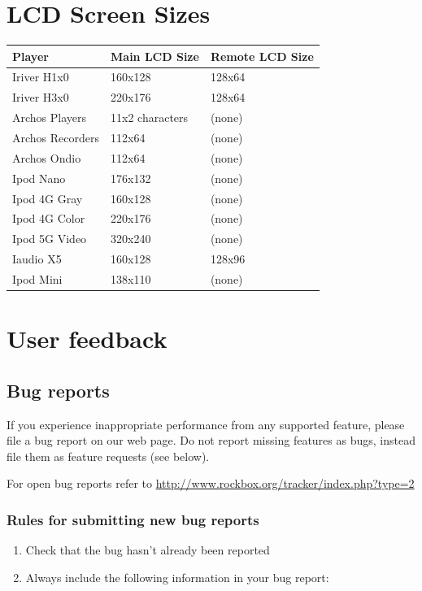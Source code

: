 \chapter{LCD Screen Sizes}
\begin{center}
  \begin{tabularx}{.8\textwidth}{lXX}\toprule
    \textbf{Player} & \textbf{Main LCD Size} & \textbf{Remote LCD Size}\\\midrule
    Iriver H1x0 & 160x128 & 128x64\\
    Iriver H3x0 & 220x176 & 128x64\\
    Archos Players & 11x2 characters & (none)\\
    Archos Recorders & 112x64 & (none)\\ 
    Archos Ondio & 112x64 & (none)\\
    Ipod Nano & 176x132 & (none)\\
    Ipod 4G Gray & 160x128 & (none)\\
    Ipod 4G Color & 220x176 & (none)\\
    Ipod 5G Video & 320x240 & (none)\\
    Iaudio X5 & 160x128 & 128x96\\
    Ipod Mini &138x110 & (none) \\\bottomrule
  \end{tabularx}
\end{center}


\chapter{User feedback}
\section{Bug reports}
If you experience inappropriate performance from any supported feature,
please file a bug report on our web page. Do not report missing
features as bugs, instead file them as feature requests (see below).

For open bug reports refer to
\url{http://www.rockbox.org/tracker/index.php?type=2}

\subsection{Rules for submitting new bug reports}

\begin{enumerate}
\item  Check that the bug hasn't already been reported
\item  Always include the following information in your bug report:
\end{enumerate}


